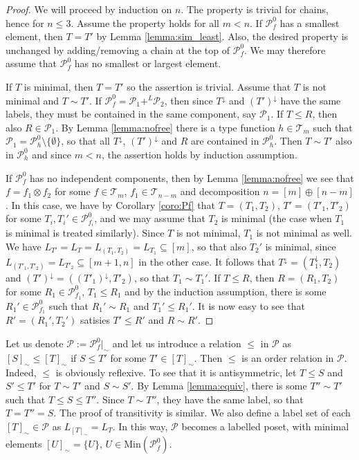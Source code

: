 \documentclass[12pt]{article}
\theoremstyle{definition}
\theoremstyle{remark}
\def\Te{\mathcal T}
\def\Pe{\mathcal P}
\begin{document}
\begin{proof} We will proceed by induction on $n$. The property is trivial for chains,
hence for $n\le 3$. Assume the property holds for all $m<n$.  If $\Pe_f^0$ has a smallest element, then $T=T'$ by Lemma \ref{lemma:sim_least}.
Also, the desired property is unchanged by adding/removing a chain at the  top of
$\Pe_f^0$.  We may therefore assume that $\Pe_f^0$ has no smallest or largest
element. 

If $T$ is minimal, then $T=T'$ so the assertion is trivial. Assume that  $T$ is
not minimal and  $T\sim T'$. If  $\Pe_f^0= \Pe_1+^L \Pe_2$, then since $T^\downarrow$ and $(T')^\downarrow$ have
the same labels, they  must be contained in the same component, say  $\Pe_1$. If $T\le R$,
then also $R\in \Pe_1$.  By Lemma
\ref{lemma:nofree} there is a type function $h\in \Te_m$ such that $\Pe_1=\Pe_h^0\setminus
\{\emptyset\}$, so that  all $T^\downarrow$, $(T')^\downarrow$ and $R$ are contained in
$\Pe_h^0$. Then $T\sim T'$ also in $\Pe_h^0$ and since $m<n$, the assertion holds by induction assumption.

If $\Pe_f^0$ has no independent components, then by Lemma \ref{lemma:nofree} we see that
 $f=f_1\otimes f_2$ for some $f\in \Te_m$, $f_1\in \Te_{n-m}$ and decomposition
 $n=[m]\oplus [n-m]$ . 
 In this case, we have by Corollary \ref{coro:Pf} that $T=(T_1,T_2)$,  $T'=(T'_1,T'_2)$ for some
$T_i, T_i'\in \Pe_{f_i}^0$, 
and we may assume that $T_2$ is minimal (the case when $T_1$ is minimal is treated
similarly). Since $T$ is not minimal, $T_1$ is not minimal as well. We have
$L_{T'}=L_{T}=L_{(T_1,T_2)}=L_{T_1}\subseteq [m]$, so that also $T_2'$ is minimal, since
$L_{(T'_1,T'_2)}=L_{T'_2}\subseteq [m+1,n]$ in the other case. It follows that
$T^\downarrow = (T_1^\downarrow,T_2)$ and $(T')^\downarrow=((T'_1)^\downarrow,T'_2)$, so
that $T_1\sim T_1'$. If $T\le R$, then $R=(R_1,T_2)$ for some $R_1\in \Pe_{f_1}^0$,
$T_1\le R_1$  and by
the induction assumption, there is some $R_1'\in \Pe_{f_1}^0$ such that $R_1'\sim R_1$ and
$T_1'\le R_1'$. It is now easy to see that $R'=(R_1',T_2')$ satisies $T'\le R'$ and $R\sim
R'$.



\end{proof}


Let us denote $\Pe:=\Pe_f^0|_\sim$ and let us introduce a relation $\le$ in $
\Pe$ as $[S]_\sim\le [T]_\sim$ if $S\le T'$ for some $T'\in [T]_\sim$.  Then $\le$ is an
order relation in $\Pe$. Indeed, $\le$ is obviously reflexive. To see that it is
antisymmetric, let  $T\le S$ and $S'\le T'$ for $T\sim T'$ and $S\sim S'$. By Lemma
\ref{lemma:equiv}, there is some $T''\sim T'$ such that $T\le S\le T''$. Since $T\sim
T''$, they have the same label, so that $T=T''=S$. The proof of transitivity is similar.
We also define a label set of each $[T]_\sim \in \Pe$ as $L_{[T]_\sim}=L_T$. In this way,
$\Pe$ becomes a labelled poset, with minimal elements $[U]_\sim=\{U\}$, $U\in
\mathrm{Min}(\Pe_f^0)$. 
\end{document}
